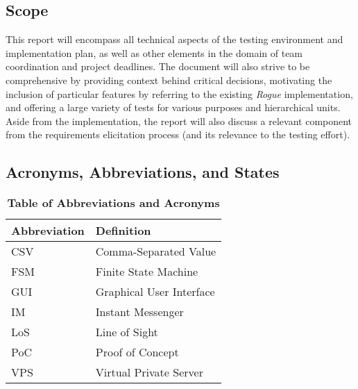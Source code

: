 \documentclass[12pt, titlepage]{article}
\begin{document}
	\subsection{Scope}
		This report will encompass all technical aspects of the testing environment and implementation plan, as well as other elements in the domain of team coordination and project deadlines.  The document will also strive to be comprehensive by providing context behind critical decisions, motivating the inclusion of particular features by referring to the existing \textit{Rogue} implementation, and offering a large variety of tests for various purposes and hierarchical units.  Aside from the implementation, the report will also discuss a relevant component from the requirements elicitation process (and its relevance to the testing effort).

	\subsection{Acronyms, Abbreviations, and States}
		
		\begin{table}[H]
			\centering
			\caption{\textbf{Table of Abbreviations and Acronyms}}
			\label{TableAbbreviations}
			\bigskip
			\begin{tabularx}{\textwidth}{p{3cm}X}
				\toprule
				\textbf{Abbreviation} & \textbf{Definition} \\
				\midrule
				CSV & Comma-Separated Value\\
				FSM & Finite State Machine\\
				GUI & Graphical User Interface\\
				IM & Instant Messenger\\
				LoS & Line of Sight\\
				PoC & Proof of Concept\\
				VPS & Virtual Private Server\\
				\bottomrule
			\end{tabularx}
		\end{table}
\end{document}
